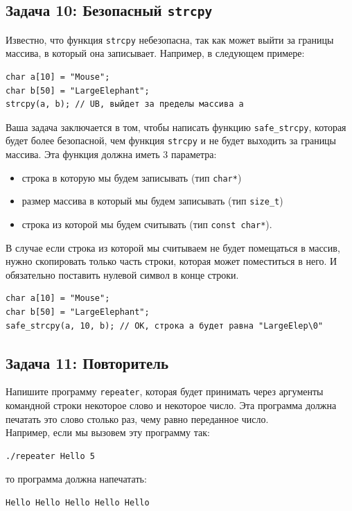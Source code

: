 \documentclass{article}
\begin{document}
\subsection*{Задача 10: Безопасный \texttt{strcpy}}
Известно, что функция \texttt{strcpy} небезопасна, так как может выйти за границы массива, в который она записывает.
Например, в следующем примере:
\begin{lstlisting}
char a[10] = "Mouse";
char b[50] = "LargeElephant";
strcpy(a, b); // UB, выйдет за пределы массива a
\end{lstlisting}
Ваша задача заключается в том, чтобы написать функцию \texttt{safe\_strcpy}, которая будет более безопасной, чем функция \texttt{strcpy} и не будет выходить за границы массива. Эта функция должна иметь 3 параметра:
\begin{itemize}
\item строка в которую мы будем записывать (тип \texttt{char*})
\item размер массива в который мы будем записывать (тип \texttt{size\_t})
\item строка из которой мы будем считывать (тип \texttt{const char*}).
\end{itemize}
В случае если строка из которой мы считываем не будет помещаться в массив, нужно скопировать только часть строки, которая может поместиться в него. И обязательно поставить нулевой символ в конце строки.

\begin{lstlisting}
char a[10] = "Mouse";
char b[50] = "LargeElephant";
safe_strcpy(a, 10, b); // OK, строка a будет равна "LargeElep\0"
\end{lstlisting}



\subsection*{Задача 11: Повторитель}
Напишите программу \texttt{repeater}, которая будет принимать через аргументы командной строки некоторое слово и некоторое число. Эта программа должна печатать это слово столько раз, чему равно переданное число.\\
Например, если мы вызовем эту программу так:
\begin{verbatim}
./repeater Hello 5
\end{verbatim}
то программа должна напечатать:
\begin{verbatim}
Hello Hello Hello Hello Hello
\end{verbatim}
\end{document}
